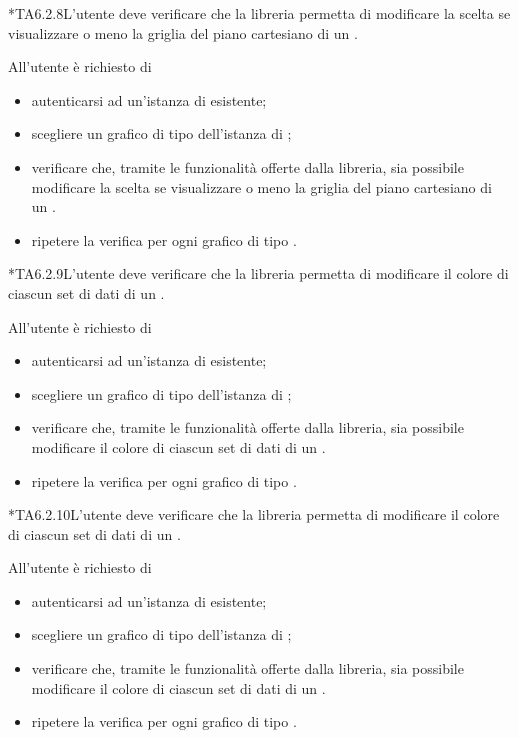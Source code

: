 	*{TA6.2.8}L'utente  deve verificare che la libreria permetta di modificare la scelta se visualizzare o meno la griglia del piano cartesiano di un .
		
		All'utente  è richiesto di
		\begin{itemize}
			\item autenticarsi ad un'istanza di \projectname{} esistente;
			\item scegliere un grafico di tipo  dell'istanza di \projectname{};
			\item verificare che, tramite le funzionalità offerte dalla libreria, sia possibile modificare la scelta se visualizzare o meno la griglia del piano cartesiano di un .
			\item ripetere la verifica per ogni grafico di tipo .
		\end{itemize}

	*{TA6.2.9}L'utente  deve verificare che la libreria permetta di modificare il colore di ciascun set di dati di un .
		
		All'utente  è richiesto di
		\begin{itemize}
			\item autenticarsi ad un'istanza di \projectname{} esistente;
			\item scegliere un grafico di tipo  dell'istanza di \projectname{};
			\item verificare che, tramite le funzionalità offerte dalla libreria, sia possibile modificare il colore di ciascun set di dati di un .
			\item ripetere la verifica per ogni grafico di tipo .
		\end{itemize}

	*{TA6.2.10}L'utente  deve verificare che la libreria permetta di modificare il colore di ciascun set di dati di un .
		
		All'utente  è richiesto di
		\begin{itemize}
			\item autenticarsi ad un'istanza di \projectname{} esistente;
			\item scegliere un grafico di tipo  dell'istanza di \projectname{};
			\item verificare che, tramite le funzionalità offerte dalla libreria, sia possibile modificare il colore di ciascun set di dati di un .
			\item ripetere la verifica per ogni grafico di tipo .
		\end{itemize}

